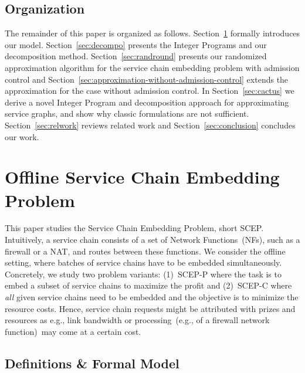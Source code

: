 \documentclass[10pt, conference, letterpaper]{IEEEtran}
\begin{document}
\subsection{Organization}

The remainder of this paper is organized as follows.
Section~\ref{sec:model} formally introduces our model.
Section~\ref{sec:decompo} presents the 
Integer Programs and our decomposition method.
Section~\ref{sec:randround} presents our randomized approximation algorithm for the service chain embedding problem with admission control and Section~\ref{sec:approximation-without-admission-control} extends the approximation for the case without admission control.
In Section~\ref{sec:cactus} we derive a novel Integer Program and decomposition approach for approximating service graphs, and show why classic formulations are not sufficient.
Section~\ref{sec:relwork} reviews related work and Section~\ref{sec:conclusion} concludes our work.

\section{Offline Service Chain Embedding Problem}\label{sec:model}

This paper studies the Service Chain Embedding Problem, short SCEP.
Intuitively, a service chain consists of a set of Network Functions~(NFs), 
such as a firewall or a NAT, and routes between these functions. 
We consider the offline setting, where batches of service chains
have to be embedded simultaneously. 
Concretely, we study two problem variants: (1)~SCEP-P where the task is to embed a subset of service chains to maximize the profit and (2)~SCEP-C where \emph{all} given service chains need to be embedded and the objective is to minimize the resource costs. Hence, service chain requests might be attributed with prizes and resources as e.g., link bandwidth 
or processing~(e.g., of a firewall network function)~may come at a certain cost.



\subsection{Definitions \& Formal Model}
\label{sec:problem-definitions}
\end{document}
